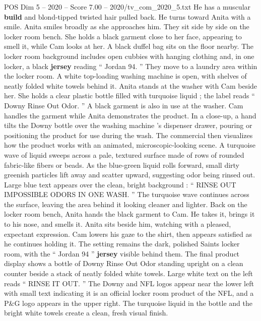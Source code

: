\begin{textsample}{POS Dim 5 – 2020 – Score 7.00 – 2020/tv\_com\_2020\_5.txt}
He has a muscular \textbf{build} and blond-tipped twisted hair pulled back.
He turns toward Anita with a smile.
Anita smiles broadly as she approaches him.
They sit side by side on the locker room bench.
She holds a black garment close to her face, appearing to smell it, while Cam looks at her.
A black duffel bag sits on the floor nearby.
The locker room background includes open cubbies with hanging clothing and, in one locker, a black \textbf{jersey} reading “ Jordan 94. ” They move to a laundry area within the locker room.
A white top-loading washing machine is open, with shelves of neatly folded white towels behind it.
Anita stands at the washer with Cam beside her.
She holds a clear plastic bottle filled with turquoise liquid ; the label reads “ Downy Rinse Out Odor. ” A black garment is also in use at the washer.
Cam handles the garment while Anita demonstrates the product.
In a close-up, a hand tilts the Downy bottle over the washing machine ’s dispenser drawer, pouring or positioning the product for use during the wash.
The commercial then visualizes how the product works with an animated, microscopic-looking scene.
A turquoise wave of liquid sweeps across a pale, textured surface made of rows of rounded fabric-like fibers or beads.
As the blue-green liquid rolls forward, small dirty greenish particles lift away and scatter upward, suggesting odor being rinsed out.
Large blue text appears over the clean, bright background : “ RINSE OUT IMPOSSIBLE ODORS IN ONE WASH. ” The turquoise wave continues across the surface, leaving the area behind it looking cleaner and lighter.
Back on the locker room bench, Anita hands the black garment to Cam.
He takes it, brings it to his nose, and smells it.
Anita sits beside him, watching with a pleased, expectant expression.
Cam lowers his gaze to the shirt, then appears satisfied as he continues holding it.
The setting remains the dark, polished Saints locker room, with the “ Jordan 94 ” \textbf{jersey} visible behind them.
The final product display shows a bottle of Downy Rinse Out Odor standing upright on a clean counter beside a stack of neatly folded white towels.
Large white text on the left reads “ RINSE IT OUT. ” The Downy and NFL logos appear near the lower left with small text indicating it is an official locker room product of the NFL, and a P\&G logo appears in the upper right.
The turquoise liquid in the bottle and the bright white towels create a clean, fresh visual finish.

\end{textsample}
